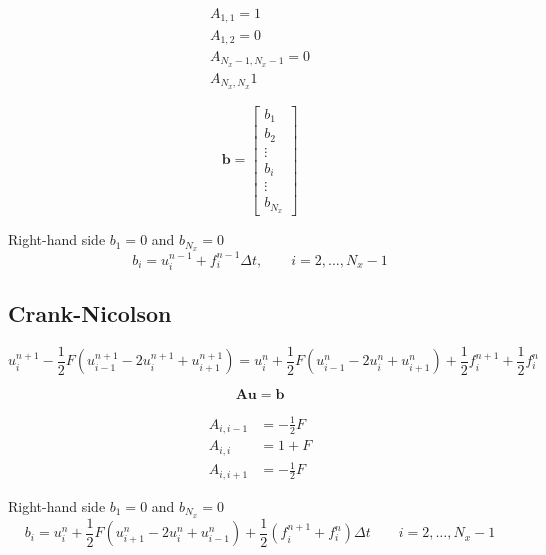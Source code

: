 \documentclass[a4paper,12pt]{article}
\begin{document}
\begin{align*}
A_{1,1} = 1 \\
A_{1,2} = 0 \\
A_{N_x-1,N_x-1} = 0 \\
A_{N_x,N_x} 1
\end{align*}

\begin{equation}
\mathbf{b} = \begin{bmatrix}
b_{1} \\
b_{2} \\
\vdots \\
b_{i} \\
\vdots \\
b_{N_x}
\end{bmatrix}
\end{equation}

Right-hand side $b_{1} = 0$ and $b_{N_x} = 0$
\begin{equation}
b_{i} = u^{n-1}_{i} + f_{i}^{n-1} \Delta t, \qquad i = 2, \ldots, N_{x}-1
\end{equation}



\subsection{Crank-Nicolson}

\begin{equation}
u_{i}^{n+1} - \frac{1}{2} F \left( u_{i-1}^{n+1} - 2u^{n+1}_{i} + u^{n+1}_{i+1} \right) =
u_{i}^{n} + \frac{1}{2} F \left( u_{i-1}^{n} - 2u^{n}_{i} + u^{n}_{i+1} \right) +
\frac{1}{2} f_{i}^{n+1} + \frac{1}{2} f_{i}^{n}
\end{equation}


\begin{equation}
\mathbf{A}\mathbf{u} = \mathbf{b}
\end{equation}

\begin{align*}
A_{i,i-1} & = -\frac{1}{2}F \\
A_{i,i}   & = 1 + F \\
A_{i,i+1} & = -\frac{1}{2}F
\end{align*}

Right-hand side $b_{1} = 0$ and $b_{N_x} = 0$
\begin{equation}
b_{i} = u^{n}_{i} + \frac{1}{2}F \left( u^{n}_{i+1} -2u^{n}_{i} + u^{n}_{i-1} \right) +
\frac{1}{2} \left( f_{i}^{n+1} + f_{i}^{n} \right) \Delta t
\qquad i = 2, \ldots, N_{x}-1
\end{equation}









\end{document}
